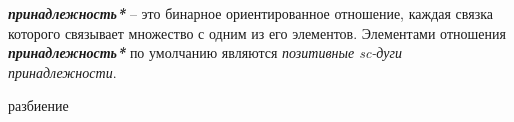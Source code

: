 \begin{SCn}
\end{SCn}

\textbf{\textit{принадлежность*}} – это бинарное ориентированное отношение, каждая связка которого связывает множество с одним из его элементов. Элементами отношения \textbf{\textit{принадлежность*}} по умолчанию являются \textit{позитивные sc-дуги принадлежности}.




	

\begin{SCn}
\begin{scnrelfromset}{разбиение}
\end{scnrelfromset}
\end{SCn}

